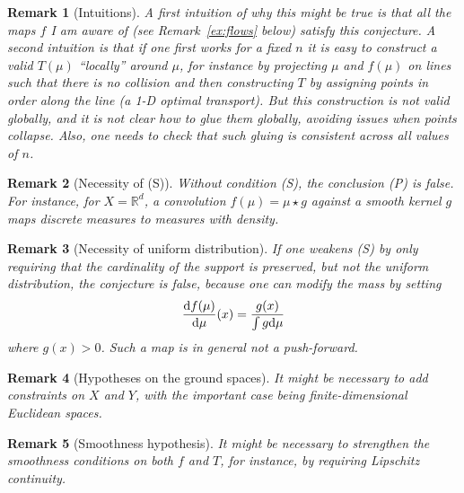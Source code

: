 \documentclass{article}
\newtheorem{remark}{Remark}
\begin{document}
\begin{remark}[Intuitions]
A first intuition of why this might be true is that all the maps \( f \) I am aware of (see Remark~\ref{ex:flows} below) satisfy this conjecture. A second intuition is that if one first works for a fixed \( n \) it is easy to construct a valid \( T(\mu) \) ``locally'' around \( \mu \), for instance by projecting \( \mu \) and \( f(\mu) \) on lines such that there is no collision and then constructing \( T \) by assigning points in order along the line (a 1-D optimal transport). But this construction is not valid globally, and it is not clear how to glue them globally, avoiding issues when points collapse. Also, one needs to check that such gluing is consistent across all values of \( n \).
\end{remark}

\begin{remark}[Necessity of (S)]
Without condition (S), the conclusion (P) is false. For instance, for \( X = \mathbb{R}^d \), a convolution \( f(\mu) = \mu \star g \) against a smooth kernel \( g \) maps discrete measures to measures with density. 
\end{remark}

\begin{remark}[Necessity of uniform distribution]
If one weakens (S) by only requiring that the cardinality of the support is preserved, but not the uniform distribution, the conjecture is false, because one can modify the mass by setting 
\[
\frac{\text{\upshape d}f(\mu)}{\text{\upshape d}\mu}(x) = \frac{g(x)}{ \int g \text{\upshape d}\mu }
\]
where \( g(x) > 0 \). Such a map is in general not a push-forward. 
\end{remark}

\begin{remark}[Hypotheses on the ground spaces]
It might be necessary to add constraints on \( X \) and \( Y \), with the important case being finite-dimensional Euclidean spaces.
\end{remark}

\begin{remark}[Smoothness hypothesis]
It might be necessary to strengthen the smoothness conditions on both \( f \) and \( T \), for instance, by requiring Lipschitz continuity.
\end{remark}
\end{document}
